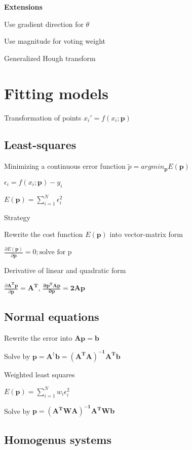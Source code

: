 \documentclass{article}
\begin{document}
\begin{multicols*}{2}
{\textbf{Extensions}
\begin{compactitem}
	\item Use gradient direction for $\theta$
	\item Use magnitude for voting weight
	\item Generalized Hough transform
\end{compactitem}

\section{Fitting models}

Transformation of points $x_i' = f(x_i; \mathbf{p})$

\subsection{Least-squares}
Minimizing a continuous error function $\tilde{p} = argmin_\mathbf{p}E(\mathbf{p})$

$\epsilon_i = f(x_i; \mathbf{p}) - y_i$

$E(\mathbf{p}) = \sum_{i=1}^{N}\epsilon_i^2$

Strategy

\begin{compactenum}
	\item Rewrite the cost function $E(\mathbf{p})$ into vector-matrix form
	\item $\frac{\partial E(\mathbf{p})}{\partial \mathbf{p}} = 0; \text{solve for p}$
\end{compactenum}

Derivative of linear and quadratic form

$\frac{\partial \mathbf{A^Tp}}{\partial \mathbf{p}} = \mathbf{A^T}$,
$\mathbf{\frac{\partial p^T A p}{\partial p} = 2 A p}$


\subsection{Normal equations}

Rewrite the error into $\mathbf{A p = b}$

Solve by $\mathbf{p = A^\dagger b = (A^TA)^{-1}A^Tb}$

Weighted least squares

$E(\mathbf{p}) = \sum_{i=1}^{N}w_i\epsilon_i^2$

Solve by $\mathbf{p = (A^TWA)^{-1}A^TWb}$

\subsection{Homogenus systems}

}
\end{multicols*}
\end{document}
